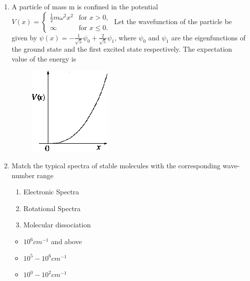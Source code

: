 \documentclass[journal,12pt,onecolumn]{IEEEtran}
\theoremstyle{remark}
\begin{document}
\begin{enumerate}
\item A particle of mass m is confined in the potential $V(x)=\begin{cases} \frac{1}{2}m\omega^{2}x^{2} & \text{for } x>0, \\ \infty & \text{for } x \le 0. \end{cases}$
	Let the wavefunction of the particle be given by $\psi(x)=-\frac{1}{\sqrt{5}}\psi_{0}+\frac{2}{\sqrt{5}}\psi_{1}$, where $\psi_0$ and $\psi_1$ are the eigenfunctions of the ground state and the first excited state respectively. The expectation value of the energy is\hfill{}
	\begin{figure}[H] \centering
		\caption*{} \label{fig:35} \includegraphics[width=0.2\columnwidth]{figs/35.png}
	\end{figure}


\begin{enumerate}  \end{enumerate}

\item Match the typical spectra of stable molecules with the corresponding wave-number range
\hfill{}

\begin{multicols}{2}
 \begin{enumerate}
  \item Electronic Spectra
  \item Rotational Spectra
  \item Molecular dissociation
 \end{enumerate}
\columnbreak
\begin{itemize}
 \item $10^6 cm^{-1}$ and above
 \item $10^5 - 10^6 cm^{-1}$
 \item $10^0 - 10^2 cm^{-1}$
\end{itemize}



\end{multicols}
\end{enumerate}
\end{document}
